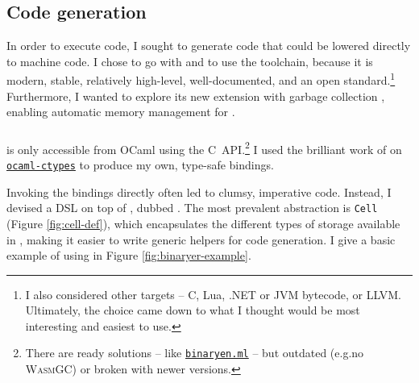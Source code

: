 \subsection{Code generation} 
\label{subsec:codegen}

In order to execute \fabric{} code, I sought to generate code that could be lowered directly to machine code. I chose to go with \wasm{} \cite{wasm} and to use the \binaryen{} \cite{binaryen} toolchain, because it is modern, stable, relatively high-level, well-documented, and an open standard.\footnote{I also considered other targets -- C, Lua, .NET or JVM bytecode, or LLVM. Ultimately, the choice came down to what I thought would be most interesting and easiest to use.} Furthermore, I wanted to explore its new extension with garbage collection \cite{wasm-gc}, enabling automatic memory management for \fabric{}.



\subsubsection{\binaryendsl{}}
\binaryen{} is only accessible from OCaml using the C~API.\footnote{There are ready solutions -- like \href{https://github.com/grain-lang/binaryen.ml}{\texttt{binaryen.ml}} -- but outdated (e.g.\@ no \textsc{WasmGC}) or broken with newer \binaryen{} versions.} I used the brilliant work of \textcite{ocaml-ctypes} on \href{https://github.com/yallop/ocaml-ctypes}{\texttt{ocaml-ctypes}} to produce my own, type-safe bindings.

Invoking the bindings directly often led to clumsy, imperative code. Instead, I devised a DSL on top of \binaryen{}, dubbed \binaryendsl{}. The most prevalent abstraction is \texttt{Cell} (Figure \ref{fig:cell-def}), which encapsulates the different types of storage available in \wasm{}, making it easier to write generic helpers for code generation.
I give a basic example of using \binaryendsl{} in Figure \ref{fig:binaryer-example}. 

